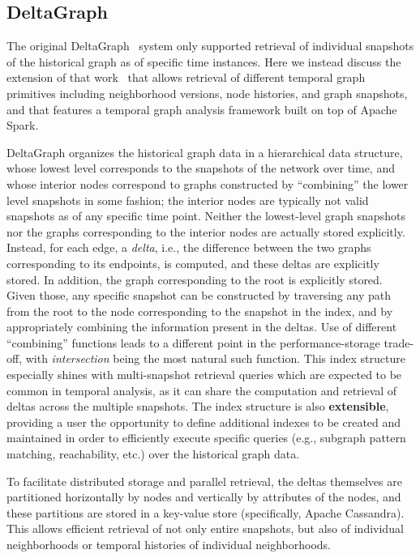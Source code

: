 \documentclass{svjour3}
\begin{document}
\subsection{DeltaGraph}
The original DeltaGraph~\cite{KhuranaD13:HistoricGraph} system only supported retrieval of individual snapshots of the historical graph as of specific time instances. Here we instead discuss the extension of that work~\cite{KhuranaD16:HistoricGraph} that allows retrieval of different temporal graph primitives including neighborhood versions, node histories, and graph snapshots, and that features a temporal graph analysis framework built on top of Apache Spark. 

\vspace{2mm}
 DeltaGraph organizes the historical graph data in a hierarchical data structure, whose lowest level corresponds
to the snapshots of the network over time, and whose interior nodes correspond to graphs constructed by ``combining''
the lower level snapshots in some fashion; the interior nodes are typically not valid snapshots as of any specific time point. Neither the lowest-level
graph snapshots nor the graphs corresponding to the interior nodes are actually stored explicitly. Instead, for each edge, a {\em delta}, i.e., the
difference between the two graphs corresponding to its endpoints, is computed, and these deltas are explicitly stored. In addition, the graph
corresponding to the root is explicitly stored. Given those, any specific snapshot can be constructed by traversing any
path from the root to the node corresponding to the snapshot in the index, and by appropriately combining the information present in the deltas.
Use of different ``combining'' functions leads to a different point in the performance-storage trade-off, with {\em intersection} being the most
natural such function.  This index structure especially shines with multi-snapshot retrieval queries which are expected to be common in temporal 
analysis, as it can share the computation and retrieval of deltas across the multiple snapshots.
The index structure is also {\bf extensible}, providing a user the opportunity to define additional 
indexes to be created and maintained in order to efficiently execute specific queries (e.g., subgraph pattern matching, reachability, etc.)
    over the historical graph data.

To facilitate distributed storage and parallel retrieval, the deltas themselves are partitioned horizontally by nodes and vertically by attributes 
of the nodes, and these partitions are stored in a key-value store (specifically, Apache Cassandra). This allows efficient retrieval of not only
entire snapshots, but also of individual neighborhoods or temporal histories of individual neighborhoods.
\end{document}
